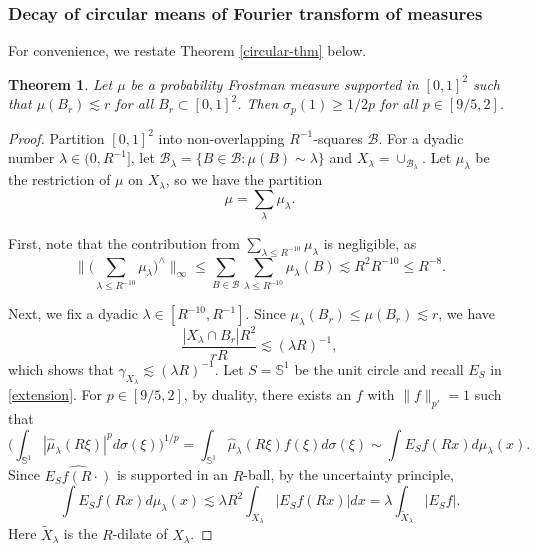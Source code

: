 \documentclass{amsart}
\numberwithin{equation}{section}
\newtheorem{theorem}{Theorem}[section]
\newcommand{\ga}{\gamma}
\newcommand{\la}{\lambda}
\newcommand{\si}{\sigma}
\newcommand{\cb}{\mathcal B}
\newcommand{\wt}{\widetilde}
\newcommand{\wh}{\widehat}
\newcommand{\ZS}{\mathbb{S}}
\begin{document}
\medskip

\subsubsection{Decay of circular means of Fourier transform of measures}


For convenience, we restate Theorem \ref{circular-thm} below.


\begin{theorem}
Let $\mu$ be a probability Frostman measure supported in $[0,1]^2$ such that $\mu(B_r)\lesssim r$ for all $B_r\subset [0,1]^2$.
Then $\si_p(1)\geq 1/2p$ for all $p\in[9/5,2]$.
\end{theorem}

\begin{proof}

Partition $[0,1]^2$ into non-overlapping $R^{-1}$-squares $\cb$.
For a dyadic number $\la\in(0,R^{-1}]$, let $\cb_\la=\{B\in\cb: \mu(B)\sim \la\}$ and $X_\la=\cup_{\cb_\la}$.
Let $\mu_\la$ be the restriction of $\mu$ on $X_\la$, so we have the partition
\begin{equation}
\label{mu-lambda}
    \mu=\sum_{\la}\mu_\la.
\end{equation}

First, note that the contribution from $\sum_{\la\leq R^{-10}}\mu_\la$ is negligible, as
\begin{equation}
\label{mu-lambda-small}
    \big\|\big(\sum_{\la\leq R^{-10}}\mu_\la\big)^\wedge\big\|_\infty\leq \sum_{B\in\cb}\sum_{\la\leq R^{-10}}\mu_\la(B)\lesssim R^2R^{-10}\leq R^{-8}.
\end{equation}

Next, we fix a dyadic $\la\in[R^{-10},R^{-1}]$.
Since $\mu_\la(B_r)\leq\mu(B_r)\lesssim r$, we have
\begin{equation}
    \frac{|X_\la\cap B_r|R^2}{rR}\lesssim (\la R)^{-1},
\end{equation}
which shows that $\ga_{X_\la}\lesssim (\la R)^{-1}$.
Let $S=\ZS^1$ be the unit circle and recall $E_S$ in \eqref{extension}.
For $p\in[9/5,2]$, by duality, there exists an $f$ with $\|f\|_{p'}=1$ such that
\begin{equation}
\label{decay-lambda}
    \Big(\int_{\ZS^1}|\wh \mu_\la(R\xi)|^pd\si(\xi)\Big)^{1/p}=\int_{\ZS^1}\wh \mu_\la(R\xi)f(\xi)d\si(\xi)\sim\int E_Sf(Rx) d\mu_\la(x).
\end{equation}
Since $\wh {E_Sf(R\cdot)}$ is supported in an $R$-ball, by the uncertainty principle, 
\begin{equation}
    \int E_Sf(Rx) d\mu_\la(x)\lesssim\la R^2\int_{X_\la} |E_Sf(Rx)| dx=\la \int_{\wt X_\la} |E_Sf|.
\end{equation}
Here $\wt X_\la$ is the $R$-dilate of $X_\la$.


\end{proof}
\end{document}
